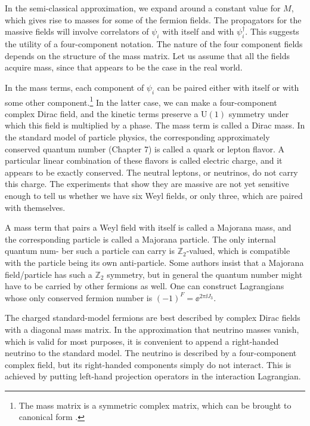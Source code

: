 In the semi-classical approximation, we expand around a constant value for $M$,
which gives rise to masses for some of the fermion fields. The propagators for the
massive fields will involve correlators of $\psi_i$ with itself and with $\psi_i^\dagger$. This suggests the
utility of a four-component notation. The nature of the four component fields depends
on the structure of the mass matrix. Let us assume that all the fields acquire mass, since
that appears to be the case in the real world.

In the mass terms, each component of $\psi_i$ can be paired either with itself or with some
other component.\footnote[10]{The mass matrix is a symmetric complex matrix, which can be brought to canonical form \cite{banks-ref-31}.} In the latter case, we can make a four-component complex Dirac
field, and the kinetic terms preserve a $\mathrm{U}(1)$ symmetry under which this field is multiplied
by a phase. The mass term is called a Dirac mass. In the standard model of particle
physics, the corresponding approximately conserved quantum number (Chapter 7) is
called a quark or lepton flavor. A particular linear combination of these flavors is
called electric charge, and it appears to be exactly conserved. The neutral leptons, or
neutrinos, do not carry this charge. The experiments that show they are massive are
not yet sensitive enough to tell us whether we have six Weyl fields, or only three, which
are paired with themselves.

A mass term that pairs a Weyl field with itself is called a Majorana mass, and the
corresponding particle is called a Majorana particle. The only internal quantum num-
ber such a particle can carry is $\mathbb Z_2$-valued, which is compatible with the particle being
its own anti-particle. Some authors insist that a Majorana field/particle has such a
$\mathbb Z_2$ symmetry, but in general the quantum number might have to be carried by other
fermions as well. One can construct Lagrangians whose only conserved fermion number
is $(-1)^F=\ee^{2\pi\ii J_3}$.

The charged standard-model fermions are best described by complex Dirac fields
with a diagonal mass matrix. In the approximation that neutrino masses vanish, which
is valid for most purposes, it is convenient to append a right-handed neutrino to the
standard model. The neutrino is described by a four-component complex field, but its
right-handed components simply do not interact. This is achieved by putting left-hand
projection operators in the interaction Lagrangian.

